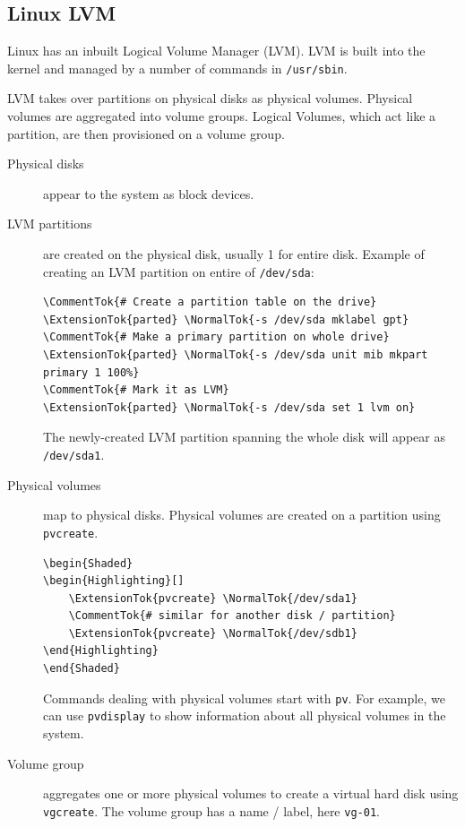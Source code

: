 \subsection{Linux LVM}\label{linux-lvm}

Linux has an inbuilt Logical Volume Manager (LVM). LVM is built into the
kernel and managed by a number of commands in \texttt{/usr/sbin}.

LVM takes over partitions on physical disks as physical volumes.
Physical volumes are aggregated into volume groups. Logical Volumes,
which act like a partition, are then provisioned on a volume group.

\begin{description}
\item[Physical disks]
appear to the system as block devices.
\item[LVM partitions]
are created on the physical disk, usually 1 for entire disk. Example of
creating an LVM partition on entire of \texttt{/dev/sda}:

\begin{verbatim}
\CommentTok{# Create a partition table on the drive}
\ExtensionTok{parted} \NormalTok{-s /dev/sda mklabel gpt}
\CommentTok{# Make a primary partition on whole drive}
\ExtensionTok{parted} \NormalTok{-s /dev/sda unit mib mkpart primary 1 100%}
\CommentTok{# Mark it as LVM}
\ExtensionTok{parted} \NormalTok{-s /dev/sda set 1 lvm on}
\end{verbatim}

The newly-created LVM partition spanning the whole disk will appear as
\texttt{/dev/sda1}.
\item[Physical volumes]
map to physical disks. Physical volumes are created on a partition using
\texttt{pvcreate}.

\begin{verbatim}
\begin{Shaded}
\begin{Highlighting}[]
    \ExtensionTok{pvcreate} \NormalTok{/dev/sda1}
    \CommentTok{# similar for another disk / partition}
    \ExtensionTok{pvcreate} \NormalTok{/dev/sdb1}
\end{Highlighting}
\end{Shaded}
\end{verbatim}

Commands dealing with physical volumes start with \texttt{pv}. For
example, we can use \texttt{pvdisplay} to show information about all
physical volumes in the system.
\item[Volume group]
aggregates one or more physical volumes to create a virtual hard disk
using \texttt{vgcreate}. The volume group has a name / label, here
\texttt{vg-01}.


\end{description}

